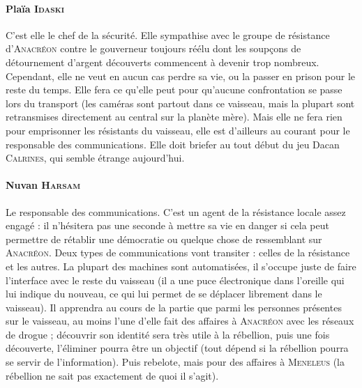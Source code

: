 \documentclass{article}
\begin{document}
{\paragraph{Plaïa \textsc{Idaski}}
{
C’est elle le chef de la sécurité.
Elle sympathise avec le groupe de résistance d’\textsc{Anacréon} contre le gouverneur toujours réélu dont les soupçons de détournement d’argent découverts commencent à devenir trop nombreux.
Cependant, elle ne veut en aucun cas perdre sa vie, ou la passer en prison pour le reste du temps.
Elle fera ce qu’elle peut pour qu’aucune confrontation se passe lors du transport (les caméras sont partout dans ce vaisseau, mais la plupart sont retransmises directement au central sur la planète mère).
Mais elle ne fera rien pour emprisonner les résistants du vaisseau, elle est d’ailleurs au courant pour le responsable des communications.
Elle doit briefer au tout début du jeu Dacan \textsc{Calrines}, qui semble étrange aujourd’hui.
}

\paragraph{Nuvan \textsc{Harsam}}
{
Le responsable des communications.
C’est un agent de la résistance locale assez engagé : il n’hésitera pas une seconde à mettre sa vie en danger si cela peut permettre de rétablir une démocratie ou quelque chose de ressemblant sur \textsc{Anacréon}.
Deux types de communications vont transiter : celles de la résistance et les autres.
La plupart des machines sont automatisées, il s’occupe juste de faire l’interface avec le reste du vaisseau (il a une puce électronique dans l’oreille qui lui indique du nouveau, ce qui lui permet de se déplacer librement dans le vaisseau).
Il apprendra au cours de la partie que parmi les personnes présentes sur le vaisseau, au moins l’une d’elle fait des affaires à \textsc{Anacréon} avec les réseaux de drogue ; découvrir son identité sera très utile à la rébellion, puis une fois découverte, l’éliminer pourra être un objectif (tout dépend si la rébellion pourra se servir de l’information).
Puis rebelote, mais pour des affaires à \textsc{Meneleus} (la rébellion ne sait pas exactement de quoi il s’agit).
}

}
\end{document}
